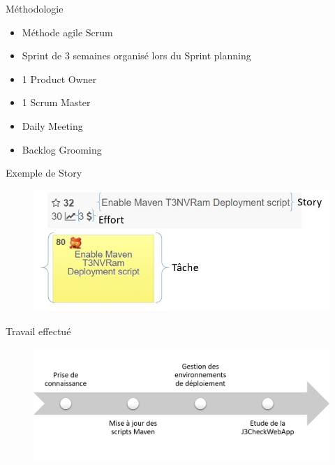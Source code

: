 \documentclass{bredelebeamer}
\begin{document}
\begin{frame}{Méthodologie}
	\begin{itemize}
		\item Méthode agile Scrum
		\bigskip
		\item Sprint de 3 semaines organisé lors du Sprint planning
		\bigskip
		\item 1 Product Owner
		\item 1 Scrum Master
		\bigskip
		\item Daily Meeting
		\item Backlog Grooming
	\end{itemize}
\end{frame}

\begin{frame}{Exemple de Story}
	\begin{figure}
		\centering
		\includegraphics[scale=0.65]{images/storySample.jpg}
	\end{figure}
\end{frame}



\begin{frame}{Travail effectué}
	\begin{figure}
		\centering
		\includegraphics[scale=0.4]{images/chronoWork.png}
	\end{figure}
\end{frame}
\end{document}
